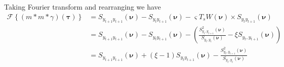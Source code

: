 \documentclass[]{article}
\begin{document}
Taking Fourier transform and rearranging we have
\begin{align}
 \mathcal F\left\lbrace (m\ast m \ast \gamma)(\boldsymbol\tau)\right\rbrace&= S_{y_{t+1}y_{t+1}}(\boldsymbol{\nu})-S_{y_{t}y_{t+1}}(\boldsymbol{\nu})-\varsigma T_s W(\boldsymbol{\nu}) \times S_{y_ty_{t+1}}(\boldsymbol{\nu}) \nonumber \\
&=S_{y_{t+1}y_{t+1}}(\boldsymbol{\nu})-S_{y_{t}y_{t+1}}(\boldsymbol{\nu})-\left(\frac{S^2_{y_{t},y_{t+1}}\left(\boldsymbol{\nu}\right)}{S_{y_{t},y_{t}}\left(\boldsymbol{\nu}\right)} - \xi S_{y_{t},y_{t+1}}\left(\boldsymbol{\nu}\right)\right) \nonumber \\
&=S_{y_{t+1}y_{t+1}}(\boldsymbol{\nu})+(\xi-1)S_{y_{t}y_{t+1}}(\boldsymbol{\nu})-\frac{S^2_{y_{t},y_{t+1}}\left(\boldsymbol{\nu}\right)}{S_{y_{t},y_{t}}\left(\boldsymbol{\nu}\right)} 
\end{align}
\end{document}
